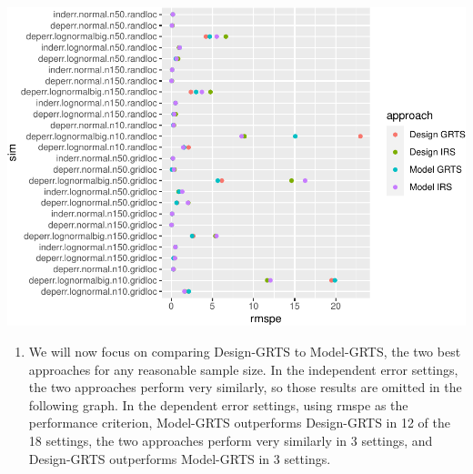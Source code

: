 \documentclass[]{elsarticle} %
\providecommand{\tightlist}{%
  \setlength{\itemsep}{0pt}\setlength{\parskip}{0pt}}
\begin{document}
\includegraphics{SpatialDVM_Manuscript_files/figure-latex/unnamed-chunk-4-1.pdf}

\begin{enumerate}
\def\labelenumi{\arabic{enumi}.}
\setcounter{enumi}{1}
\tightlist
\item
  We will now focus on comparing Design-GRTS to Model-GRTS, the two best
  approaches for any reasonable sample size. In the independent error
  settings, the two approaches perform very similarly, so those results
  are omitted in the following graph. In the dependent error settings,
  using rmspe as the performance criterion, Model-GRTS outperforms
  Design-GRTS in 12 of the 18 settings, the two approaches perform very
  similarly in 3 settings, and Design-GRTS outperforms Model-GRTS in 3
  settings.
\end{enumerate}
\end{document}
